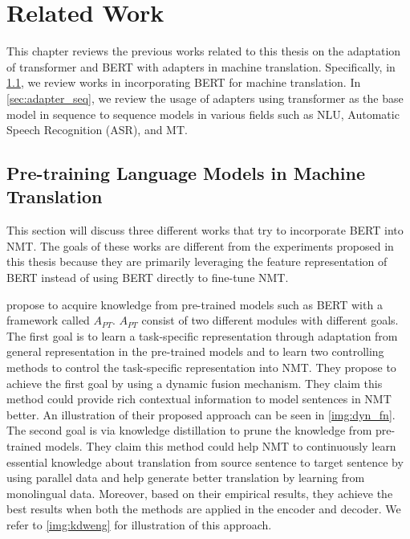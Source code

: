 \chapter{Related Work}

This chapter reviews the previous works related to this thesis on the adaptation of transformer and BERT with adapters in machine translation. Specifically, in \cref{sec:prelm_mt}, we review works in incorporating BERT for machine translation. In \cref{sec:adapter_seq}, we review the usage of adapters using transformer as the base model in sequence to sequence models in various fields such as NLU, Automatic Speech Recognition (ASR), and MT.

\section{Pre-training Language Models in Machine Translation}
\label{sec:prelm_mt}

This section will discuss three different works that try to incorporate BERT into NMT. The goals of these works are different from the experiments proposed in this thesis because they are primarily leveraging the feature representation of BERT instead of using BERT directly to fine-tune NMT.

\cite{weng2020acquiring} propose to acquire knowledge from pre-trained models such as BERT with a framework called $A_{PT}$. $A_{PT}$ consist of two different modules with different goals. The first goal is to learn a task-specific representation through adaptation from general representation in the pre-trained models and to learn two controlling methods to control the task-specific representation into NMT. They propose to achieve the first goal by using a dynamic fusion mechanism. They claim this method could provide rich contextual information to model sentences in NMT better. An illustration of their proposed approach can be seen in \cref{img:dyn_fn}. The second goal is via knowledge distillation to prune the knowledge from pre-trained models. They claim this method could help NMT to continuously learn essential knowledge about translation from source sentence to target sentence by using parallel data and help generate better translation by learning from monolingual data. Moreover, based on their empirical results, they achieve the best results when both the methods are applied in the encoder and decoder. We refer to \cref{img:kdweng} for illustration of this approach.

